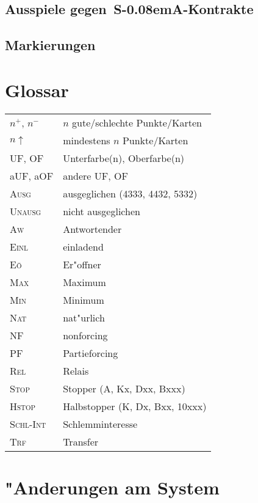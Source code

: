 \documentclass[11pt,german,twocolumn]{scrartcl}
\def\good{$^+$}
\def\bad{$^-$}
\def\pl{$\uparrow$}
\def\ufa{\textsf{UF}}
\def\aufa{\textsf{aUF}}
\def\ofa{\textsf{OF}}
\def\aofa{\textsf{aOF}}
\def\SA{\textsf{\,S\kern-0.08emA}}
\def\bal{\textsc{Ausg}}
\def\unbal{\textsc{Unausg}}
\def\nat{\textsc{Nat}}
\def\pf{\textsc{PF}}
\def\maxi{\textsc{Max}}
\def\mini{\textsc{Min}}
\def\inv{\textsc{Einl}}
\def\nf{\textsc{NF}}
\def\rel{\textsc{Rel}}
\def\stp{\textsc{Stop}}
\def\hstp{\textsc{Hstop}}
\def\aw{\textsc{Aw}}
\def\eo{\textsc{E\"o}}
\def\xfer{\textsc{Trf}}
\def\slamint{\textsc{Schl-Int}}
\begin{document}
\subsection{Ausspiele gegen \SA-Kontrakte}

\subsection{Markierungen}

\begin{appendix}

\section{Glossar}

\begin{flushleft}
\begin{tabularx}{\columnwidth}{lX}%
$n$\good, $n$\bad & $n$ gute/schlechte Punkte/Karten \\
$n$\pl & mindestens $n$ Punkte/Karten \\
\ufa, \ofa & Unterfarbe(n), Oberfarbe(n) \\
\aufa, \aofa & andere \ufa, \ofa\\
\bal & ausgeglichen (4333, 4432, 5332)\\
\unbal & nicht ausgeglichen \\
\aw & Antwortender \\
\inv & einladend \\
\eo & Er"offner \\
\maxi & Maximum \\
\mini & Minimum \\
\nat & nat"urlich \\
\nf & nonforcing \\
\pf & Partieforcing \\
\rel & Relais \\
\stp & Stopper (A, Kx, Dxx, Bxxx) \\
\hstp & Halbstopper (K, Dx, Bxx, 10xxx) \\
\slamint & Schlemminteresse \\
\xfer & Transfer \\
\end{tabularx}%
\end{flushleft}

\section{"Anderungen am System}


\end{appendix}
\end{document}
